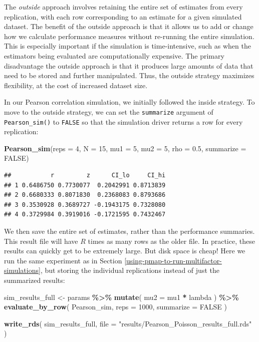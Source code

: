 \documentclass[
]{book}
\newenvironment{Shaded}{\begin{snugshade}}{\end{snugshade}}
\newcommand{\AttributeTok}[1]{\textcolor[rgb]{0.13,0.29,0.53}{#1}}
\newcommand{\ConstantTok}[1]{\textcolor[rgb]{0.56,0.35,0.01}{#1}}
\newcommand{\DecValTok}[1]{\textcolor[rgb]{0.00,0.00,0.81}{#1}}
\newcommand{\FloatTok}[1]{\textcolor[rgb]{0.00,0.00,0.81}{#1}}
\newcommand{\FunctionTok}[1]{\textcolor[rgb]{0.13,0.29,0.53}{\textbf{#1}}}
\newcommand{\NormalTok}[1]{#1}
\newcommand{\OtherTok}[1]{\textcolor[rgb]{0.56,0.35,0.01}{#1}}
\newcommand{\SpecialCharTok}[1]{\textcolor[rgb]{0.81,0.36,0.00}{\textbf{#1}}}
\newcommand{\StringTok}[1]{\textcolor[rgb]{0.31,0.60,0.02}{#1}}
\begin{document}
The \emph{outside} approach involves retaining the entire set of estimates from every replication, with each row corresponding to an estimate for a given simulated dataset.
The benefit of the outside approach is that it allows us to add or change how we calculate performance measures without re-running the entire simulation.
This is especially important if the simulation is time-intensive, such as when the estimators being evaluated are computationally expensive.
The primary disadvantage the outside approach is that it produces large amounts of data that need to be stored and further manipulated.
Thus, the outside strategy maximizes flexibility, at the cost of increased dataset size.

In our Pearson correlation simulation, we initially followed the inside strategy. To move to the outside strategy, we can set the \texttt{summarize} argument of \texttt{Pearson\_sim()} to \texttt{FALSE} so that the simulation driver returns a row for every replication:

\begin{Shaded}
\begin{Highlighting}[]
\FunctionTok{Pearson\_sim}\NormalTok{(}\AttributeTok{reps =} \DecValTok{4}\NormalTok{, }\AttributeTok{N =} \DecValTok{15}\NormalTok{, }\AttributeTok{mu1 =} \DecValTok{5}\NormalTok{, }\AttributeTok{mu2 =} \DecValTok{5}\NormalTok{, }\AttributeTok{rho =} \FloatTok{0.5}\NormalTok{, }\AttributeTok{summarize =} \ConstantTok{FALSE}\NormalTok{)}
\end{Highlighting}
\end{Shaded}

\begin{verbatim}
##           r         z      CI_lo     CI_hi
## 1 0.6486750 0.7730077  0.2042991 0.8713839
## 2 0.6680333 0.8071830  0.2368083 0.8793686
## 3 0.3530928 0.3689727 -0.1943175 0.7328080
## 4 0.3729984 0.3919016 -0.1721595 0.7432467
\end{verbatim}

We then save the entire set of estimates, rather than the performance summaries.
This result file will have \(R\) times as many rows as the older file. In practice, these results can quickly get to be extremely large.
But disk space is cheap!
Here we run the same experiment as in Section \ref{using-pmap-to-run-multifactor-simulations}, but storing the individual replications instead of just the summarized results:

\begin{Shaded}
\begin{Highlighting}[]
\NormalTok{sim\_results\_full }\OtherTok{\textless{}{-}} 
\NormalTok{  params }\SpecialCharTok{\%\textgreater{}\%}
  \FunctionTok{mutate}\NormalTok{( }\AttributeTok{mu2 =}\NormalTok{ mu1 }\SpecialCharTok{*}\NormalTok{ lambda ) }\SpecialCharTok{\%\textgreater{}\%}
  \FunctionTok{evaluate\_by\_row}\NormalTok{( Pearson\_sim, }\AttributeTok{reps =} \DecValTok{1000}\NormalTok{, }\AttributeTok{summarize =} \ConstantTok{FALSE}\NormalTok{ )}

\FunctionTok{write\_rds}\NormalTok{( sim\_results\_full, }\AttributeTok{file =} \StringTok{"results/Pearson\_Poisson\_results\_full.rds"}\NormalTok{ )}
\end{Highlighting}
\end{Shaded}
\end{document}
